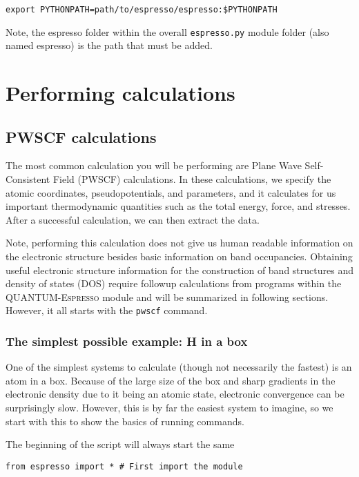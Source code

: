 \documentclass[colorlinks=true,urlcolor=blue,linkcolor=blue,citecolor=red]{article}
\begin{document}
\begin{verbatim}
export PYTHONPATH=path/to/espresso/espresso:$PYTHONPATH
\end{verbatim}

Note, the espresso folder within the overall \texttt{espresso.py} module folder (also named espresso) is the path that must be added.

\section{Performing calculations}
\label{sec-3}
\subsection{PWSCF calculations}
\label{sec-3-1}
The most common calculation you will be performing are Plane Wave Self-Consistent Field (PWSCF) calculations. In these calculations, we specify the atomic coordinates, pseudopotentials, and parameters, and it calculates for us important thermodynamic quantities such as the total energy, force, and stresses. After a successful calculation, we can then extract the data.

Note, performing this calculation does not give us human readable information on the electronic structure besides basic information on band occupancies. Obtaining useful electronic structure information for the construction of band structures and density of states (DOS) require followup calculations from programs within the \textsc{QUANTUM-Espresso} module and will be summarized in following sections. However, it all starts with the \texttt{pwscf} command.

\subsubsection{The simplest possible example: H in a box}
\label{sec-3-1-1}
One of the simplest systems to calculate (though not necessarily the fastest) is an atom in a box. Because of the large size of the box and sharp gradients in the electronic density due to it being an atomic state, electronic convergence can be surprisingly slow. However, this is by far the easiest system to imagine, so we start with this to show the basics of running commands.

The beginning of the script will always start the same
\begin{verbatim}
from espresso import * # First import the module
\end{verbatim}
\end{document}
